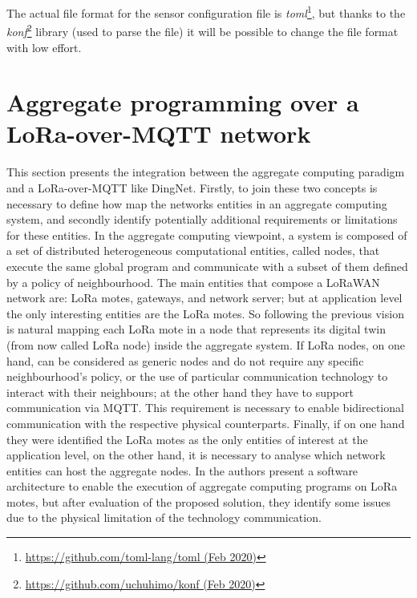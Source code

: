 % 
The actual file format for the sensor configuration file is \textit{toml}\footnote{\href{https://github.com/toml-lang/toml}{https://github.com/toml-lang/toml (Feb 2020)}}, but thanks to the \textit{konf}\footnote{\href{https://github.com/uchuhimo/konf}{https://github.com/uchuhimo/konf (Feb 2020)}} library (used to parse the file) it will be possible to change the file format with low effort.



\section{Aggregate programming over a LoRa-over-MQTT network}
\label{sec:contributionACOverDingNet}
This section presents the integration between the aggregate computing paradigm and a LoRa-over-MQTT like DingNet.
Firstly, to join these two concepts is necessary to define how map the networks entities in an aggregate computing system, and secondly identify potentially additional requirements or limitations for these entities.
In the aggregate computing viewpoint, a system is composed of a set of distributed heterogeneous computational entities, called nodes, that execute the same global program and communicate with a subset of them defined by a policy of neighbourhood. 
The main entities that compose a LoRaWAN network are: LoRa motes, gateways, and network server; but at application level the only interesting entities are the LoRa motes.
So following the previous vision is natural mapping each LoRa mote in a node that represents its digital twin (from now called LoRa node) inside the aggregate system.
If LoRa nodes, on one hand, can be considered as generic nodes and do not require any specific neighbourhood's policy, or the use of particular communication technology to interact with their neighbours; at the other hand they have to support communication via MQTT. 
This requirement is necessary to enable bidirectional communication with the respective physical counterparts.
Finally, if on one hand they were identified the LoRa motes as the only entities of interest at the application level, on the other hand, it is necessary to analyse which network entities can host the aggregate nodes. 
In \cite{CCNCPS2018} the authors present a software architecture to enable the execution of aggregate computing programs on LoRa motes, but after evaluation of the proposed solution, they identify some issues due to the physical limitation of the technology communication. 

